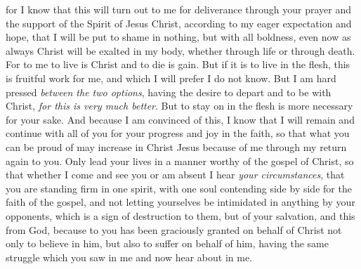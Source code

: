 \begin{biblechapter}
\verse for I know that this will turn out to me for deliverance through your prayer and the support of the Spirit of Jesus Christ,
\verse according to my eager expectation and hope, that I will be put to shame in nothing, but with all boldness, even now as always Christ will be exalted in my body, whether through life or through death.
\verse For to me to live is Christ and to die is gain.
\verse But if it is to live in the flesh, this is fruitful work for me, and which I will prefer I do not know.
\verse But I am hard pressed \textit{between the two options}, having the desire to depart and to be with Christ, \textit{for this is very much better}.
\verse But to stay on in the flesh is more necessary for your sake.
\verse And because I am convinced of this, I know that I will remain and continue with all of you for your progress and joy in the faith,
\verse so that what you can be proud of may increase in Christ Jesus because of me through my return again to you.
 Only lead your lives in a manner worthy of the gospel of Christ, so that whether I come and see you or am absent I hear \textit{your circumstances}, that you are standing firm in one spirit, with one soul contending side by side for the faith of the gospel,
\verse and not letting yourselves be intimidated in anything by your opponents, which is a sign of destruction to them, but of your salvation, and this from God,
\verse because to you has been graciously granted on behalf of Christ not only to believe in him, but also to suffer on behalf of him,
\verse having the same struggle which you saw in me and now hear about in me.
\end{biblechapter}

